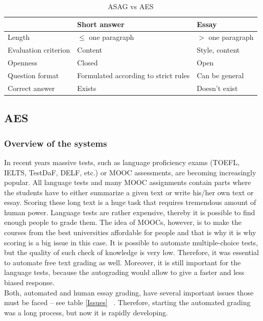 \begin{table}[h!]
\centering
\caption{ASAG vs AES}
\label{ASAGvsAES}
\begin{tabular}{|l|l|l|}
\hline
 & Short answer &  Essay \\ \hline
 Length & $\leq$ one paragraph & $>$ one paragraph  \\ \hline
 Evaluation criterion & Content &  Style, content \\ \hline
 Openness & Closed &  Open \\ \hline
 Question format & Formulated according to strict rules & Can be general \\ \hline
 Correct answer & Exists & Doesn't exist \\ \hline
\end{tabular}
\end{table}



\subsection{AES}

\subsubsection{Overview of the systems}

In recent years massive tests, such as language proficiency exams (TOEFL, IELTS, TestDaF, DELF, etc.) or MOOC assessments, are becoming increasingly popular. All language tests and many MOOC assignments contain parts where the students have to either summarize a given text or write his/her own text or essay. Scoring these long text is a huge task that requires tremendous amount of human power. Language tests are rather expensive, thereby it is possible to find enough people to grade them. The idea of MOOCs, however, is to make the courses from the best universities affordable for people and that is why it is why scoring is a big issue in this case. It is possible to automate multiple-choice tests, but the quality of such check of knowledge is very low. Therefore, it was essential to automate free text grading as well. Moreover, it is still important for the language tests, because the autograding would allow to give a faster and less biased response.\\

Both, automated and human essay grading, have several important issues those must be faced -- see table \ref{Issues} ~\cite{Blood}. Therefore, starting the automated grading was a long process, but now it is rapidly developing. \\


